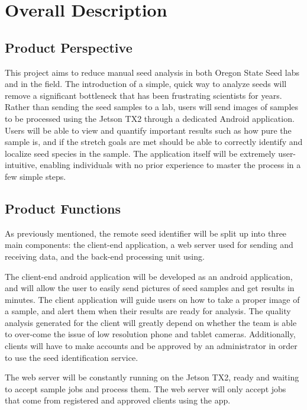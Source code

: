 \documentclass[onecolumn, draftclsnofoot,10pt, compsoc]{IEEEtran}
\begin{document}
\section{Overall Description}
\subsection{Product Perspective}
This project aims to reduce manual seed analysis in both Oregon State Seed labs and in the field. The introduction of a simple, quick way to analyze seeds will remove a significant bottleneck that has been frustrating scientists for years.
Rather than sending the seed samples to a lab, users will send images of samples to be processed using the Jetson TX2 through a dedicated Android application.
Users will be able to view and quantify important results such as how pure the sample is, and if the stretch goals are met should be able to correctly identify and localize seed species in the sample.
The application itself will be extremely user-intuitive, enabling individuals with no prior experience to master the process in a few simple steps.


\subsection{Product Functions}

As previously mentioned, the remote seed identifier will be split up into three main components: the client-end application, a web server used for sending and receiving data, and the back-end processing unit using. 

The client-end android application will be developed as an android application, and will allow the user to easily send pictures of seed samples and get results in minutes. The client application will guide users on how to take a proper image of a sample, and alert them when their results are ready for analysis. The quality analysis generated for the client will greatly depend on whether the team is able to over-come the issue of low resolution phone and tablet cameras. Additionally, clients will have to make accounts and be approved by an administrator in order to use the seed identification service.

The web server will be constantly running on the Jetson TX2, ready and waiting to accept sample jobs and process them. The web server will only accept jobs that come from registered and approved clients using the app. 
\end{document}
